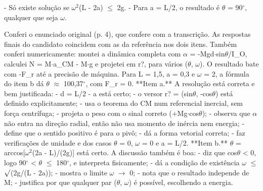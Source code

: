 \documentclass{article}%
\begin{document}
{-} Só existe solução se $\omega$$^2$(L - 2a) $\leq$ 2g.\newline%
{-} Para a = L/2, o resultado é $\theta$ = 90$^\circ$, qualquer que seja $\omega$.\par %
Conferi o enunciado original (p. 4), que confere com a transcrição. As respostas finais do candidato coincidem com as da referência nos dois itens. Também conferi numericamente: montei a dinâmica completa com $\alpha$ = -Mgd$\cdot$sin$\theta$/I\_O, calculei N = M$\cdot$a\_CM - M$\cdot$g e projetei em r?, para vários ($\theta$, $\omega$). O resultado bate com -F\_r até a precisão de máquina. Para L = 1,5, a = 0,3 e $\omega$ = 2, a fórmula do item b dá $\theta$ $\approx$ 100,37$^\circ$, com F\_r = 0.\newline%
\newline%
**Item a.** A resolução está correta e bem justificada:\newline%
{-} d = L/2 - a está certo;\newline%
{-} o versor r? = (sin$\theta$, -cos$\theta$) está definido explicitamente;\newline%
{-} usa o teorema do CM num referencial inercial, sem força centrífuga;\newline%
{-} projeta o peso com o sinal correto (+Mg$\cdot$cos$\theta$);\newline%
{-} observa que $\alpha$ não entra na direção radial, então não usa momento de inércia nem energia;\newline%
{-} define que o sentido positivo é para o pivô;\newline%
{-} dá a forma vetorial correta;\newline%
{-} faz verificações de unidade e dos casos $\theta$ = 0, $\omega$ = 0 e a = L/2.\newline%
\newline%
**Item b.** $\theta$ = arccos{[}$\omega$$^2$(2a - L)/(2g){]} está certo. A discussão também é boa:\newline%
{-} diz que cos$\theta$ < 0, logo 90$^\circ$ < $\theta$ $\leq$ 180$^\circ$, e interpreta fisicamente;\newline%
{-} dá a condição de existência $\omega$ $\leq$ $\surd$(2g/(L - 2a));\newline%
{-} mostra o limite $\omega$ $\to$ 0;\newline%
{-} nota que o resultado independe de M;\newline%
{-} justifica por que qualquer par ($\theta$, $\omega$) é possível, escolhendo a energia.\newline%
\end{document}
